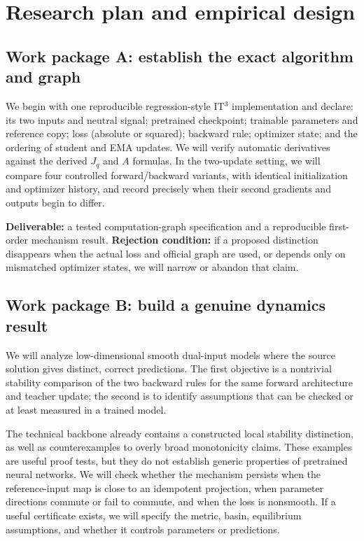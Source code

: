 \documentclass[11pt,a4paper]{article}
\begin{document}
\section{Research plan and empirical design}
\label{sec:work}

\subsection{Work package A: establish the exact algorithm and graph}
We begin with one reproducible regression-style IT$^3$ implementation and declare: its two inputs and neutral signal; pretrained checkpoint; trainable parameters and reference copy; loss (absolute or squared); backward rule; optimizer state; and the ordering of student and EMA updates. We will verify automatic derivatives against the derived $J_q$ and $A$ formulas. In the two-update setting, we will compare four controlled forward/backward variants, with identical initialization and optimizer history, and record precisely when their second gradients and outputs begin to differ.

\textbf{Deliverable:} a tested computation-graph specification and a reproducible first-order mechanism result. \textbf{Rejection condition:} if a proposed distinction disappears when the actual loss and official graph are used, or depends only on mismatched optimizer states, we will narrow or abandon that claim.

\subsection{Work package B: build a genuine dynamics result}
We will analyze low-dimensional smooth dual-input models where the source solution gives distinct, correct predictions. The first objective is a nontrivial stability comparison of the two backward rules for the same forward architecture and teacher update; the second is to identify assumptions that can be checked or at least measured in a trained model.

The technical backbone already contains a constructed local stability distinction, as well as counterexamples to overly broad monotonicity claims. These examples are useful proof tests, but they do not establish generic properties of pretrained neural networks. We will check whether the mechanism persists when the reference-input map is close to an idempotent projection, when parameter directions commute or fail to commute, and when the loss is nonsmooth. If a useful certificate exists, we will specify the metric, basin, equilibrium assumptions, and whether it controls parameters or predictions.
\end{document}
